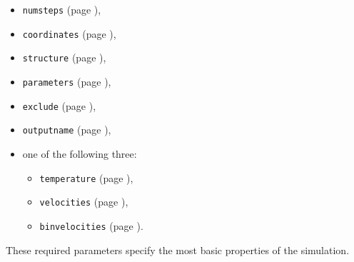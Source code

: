 \begin{itemize}

\item
{\tt numsteps} (page \pageref{param:numsteps}),

\item
{\tt coordinates} (page \pageref{param:coordinates}),

\item
{\tt structure} (page \pageref{param:structure}),

\item
{\tt parameters} (page \pageref{param:parameters}),

\item
{\tt exclude} (page \pageref{param:exclude}), 

\item
{\tt outputname} (page \pageref{param:outputname}), 

\item
one of the following three:
\begin{itemize}
\item
{\tt temperature} (page \pageref{param:temperature}),

\item
{\tt velocities} (page \pageref{param:velocities}),

\item
{\tt binvelocities} (page \pageref{param:binvelocities}).
\end{itemize}

\end{itemize}

\noindent These required parameters specify the most basic properties of
the simulation.  %
